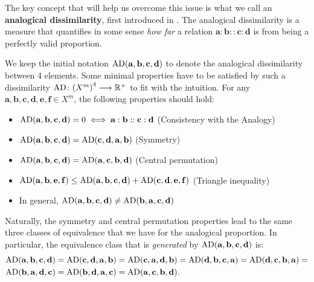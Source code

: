 The key concept that will help us overcome this issue is what we call an
\textbf{analogical dissimilarity}, first introduced in
\cite{BayMicDelIJCAI07}. The analogical dissimilarity is a measure that
quantifies in some sense \textit{how far} a relation $\mathbf{a} : \mathbf{b}
:: \mathbf{c} : \mathbf{d}$ is from being a perfectly valid proportion.

We keep the initial notation $\text{AD}(\mathbf{a}, \mathbf{b},
\mathbf{c},\mathbf{d})$ to denote the analogical dissimilarity between 4
elements.  Some  minimal properties have to be satisfied by such a
dissimilarity $\text{AD} \colon {(X^m)}^4 \longrightarrow \mathbb{R}^+$ to fit
with the intuition. For any $\mathbf{a}, \mathbf{b},\mathbf{c},\mathbf{d},
\mathbf{e}, \mathbf{f} \in X^m$, the following properties should hold:
\begin{itemize}
  \item $\text{AD}(\mathbf{a}, \mathbf{b},\mathbf{c},\mathbf{d})=0 \iff \mathbf{a} :
    \mathbf{b}:: \mathbf{c} : \mathbf{d}$ (Consistency with the Analogy)
  \item $\text{AD}(\mathbf{a}, \mathbf{b},\mathbf{c},\mathbf{d})=
    \text{AD}(\mathbf{c}, \mathbf{d},\mathbf{a},\mathbf{b})$ (Symmetry)
  \item $\text{AD}(\mathbf{a}, \mathbf{b},\mathbf{c},\mathbf{d})=
    \text{AD}(\mathbf{a}, \mathbf{c},\mathbf{b},\mathbf{d})$ (Central permutation)
  \item $\text{AD}(\mathbf{a}, \mathbf{b},\mathbf{e},\mathbf{f}) \leq \text{AD}(\mathbf{a},
    \mathbf{b},\mathbf{c},\mathbf{d}) + \text{AD}(\mathbf{c},
    \mathbf{d},\mathbf{e},\mathbf{f})$ (Triangle inequality)
  \item In general, $\text{AD}(\mathbf{a}, \mathbf{b},\mathbf{c},\mathbf{d}) \neq
    \text{AD}(\mathbf{b}, \mathbf{a},\mathbf{c},\mathbf{d})$
\end{itemize}
Naturally, the symmetry and central permutation properties lead to the same
three classes of equivalence that we have for the analogical proportion. In
particular, the equivalence class that is \textit{generated} by
$\text{AD}(\mathbf{a}, \mathbf{b},\mathbf{c},\mathbf{d})$ is:
\begin{align*}
  &\text{AD}(\mathbf{a}, \mathbf{b},\mathbf{c},\mathbf{d}) =
\text{AD}(\mathbf{c}, \mathbf{d},\mathbf{a},\mathbf{b})=
\text{AD}(\mathbf{c}, \mathbf{a},\mathbf{d},\mathbf{b})=
\text{AD}(\mathbf{d}, \mathbf{b},\mathbf{c},\mathbf{a})=
\text{AD}(\mathbf{d}, \mathbf{c},\mathbf{b},\mathbf{a})=\\
  &\text{AD}(\mathbf{b}, \mathbf{a},\mathbf{d},\mathbf{c})=
\text{AD}(\mathbf{b}, \mathbf{d},\mathbf{a},\mathbf{c})=
\text{AD}(\mathbf{a}, \mathbf{c},\mathbf{b},\mathbf{d}).
\end{align*}

